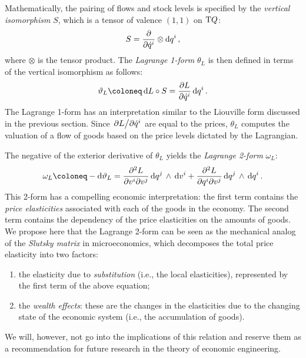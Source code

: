 Mathematically, the pairing of flows and stock levels is specified by the \emph{vertical isomorphism} $S$, which is a tensor of valence \((1,1)\) on \(\mathrm{T}Q\): \cite{Carinena1990}
\begin{equation}
    S = \pdv{}{\dot{q}^i}\otimes \dd{q^i},
\end{equation}
where $\otimes$ is the tensor product. The \emph{Lagrange 1-form} $\theta_L$ is then defined in terms of the vertical isomorphism as follows:
\begin{equation}
    \theta_L \coloneq \dd{L}\circ S = \pdv{L}{\dot{q}^i}\dd{q^i}.
\end{equation}
The Lagrange 1-form has an interpretation similar to the Liouville form discussed in the previous section. Since \(\pdv*{L}{\dot{q}^i}\) are equal to the prices, \(\theta_L\) computes the valuation of a flow of goods based on the price levels dictated by the Lagrangian. 



The negative of the exterior derivative of \(\theta_L\) yields the \emph{Lagrange 2-form} \(\omega_L\):
\begin{equation}
    \omega_L \coloneq -\dd{\theta_L} = \pdv[2]{L}{v^i}{v^j}\wedgep{\dd{q^j}}{\dd{v^i}} + \pdv[2]{L}{q^i}{v^j}\wedgep{\dd{q^j}}{\dd{q^i}}.
\end{equation}
This 2-form has a compelling economic interpretation: the first term contains the \emph{price elasticities} associated with each of the goods in the economy. The second term contains the dependency of the price elasticities on the amounts of goods.
We propose here that the Lagrange 2-form can be seen as the mechanical analog of the \emph{Slutsky matrix} in microeconomics, which decomposes the total price elasticity into two factors: \cite{varianhalr1992}
\begin{enumerate}[label=(\roman*), noitemsep]
    \item the elasticity due to \emph{substitution} (i.e., the local elasticities), represented by the first term of the above equation; 
    \item the \emph{wealth effects}: these are the changes in the elasticities due to the changing state of the economic system (i.e., the accumulation of goods).
\end{enumerate}
We will, however, not go into the implications of this relation and reserve them as a recommendation for future research in the theory of economic engineering.


